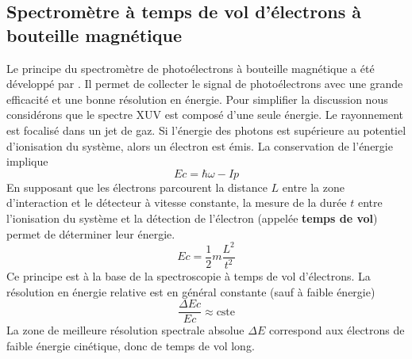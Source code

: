 \subsection{Spectromètre à temps de vol d'électrons à bouteille magnétique}
\label{subsec:TOF}
Le principe du spectromètre de photoélectrons à bouteille magnétique a été développé par . Il permet de collecter le signal de photoélectrons avec une grande efficacité et une bonne résolution en énergie. Pour simplifier la discussion nous considérons que le spectre XUV est composé d'une seule énergie. Le rayonnement est focalisé dans un jet de gaz. Si l'énergie des photons est supérieure au potentiel d'ionisation du système, alors un électron est émis. La conservation de l'énergie implique
\begin{equation}
Ec = \hbar \omega - Ip 
\end{equation}
En supposant que les électrons parcourent la distance $L$ entre la zone d'interaction et le détecteur à vitesse constante, la mesure de la durée $t$ entre l'ionisation du système et la détection de l'électron (appelée \textbf{temps de vol}) permet de déterminer leur énergie.
\begin{equation}
Ec = \frac {1}{2}m \frac{L^2}{t^2}
\end{equation}
Ce principe est à la base de la spectroscopie à temps de vol d'électrons. La résolution en énergie relative est en général constante (sauf à faible énergie) 
\begin{equation}
\frac{\Delta Ec}{Ec} \approx \text{cste}
\end{equation}
La zone de meilleure résolution spectrale absolue $\Delta E$ correspond aux électrons de faible énergie cinétique, donc de temps de vol long.

